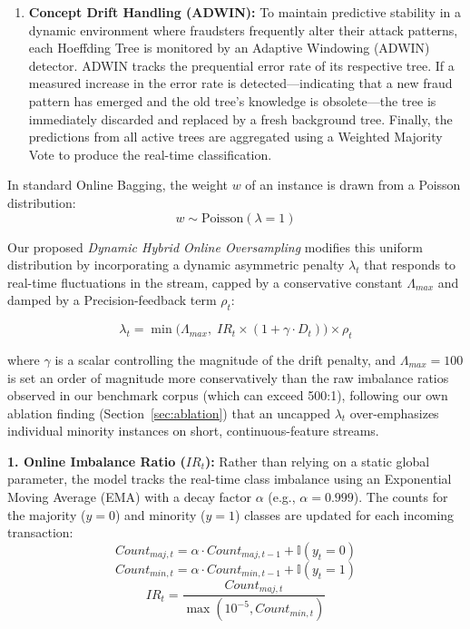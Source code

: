 \documentclass[review,12pt]{elsarticle}
\begin{document}
\begin{enumerate}
    \item \textbf{Concept Drift Handling (ADWIN):} To maintain predictive stability in a dynamic environment where fraudsters frequently alter their attack patterns, each Hoeffding Tree is monitored by an Adaptive Windowing (ADWIN) detector. ADWIN tracks the prequential error rate of its respective tree. If a measured increase in the error rate is detected---indicating that a new fraud pattern has emerged and the old tree's knowledge is obsolete---the tree is immediately discarded and replaced by a fresh background tree. Finally, the predictions from all active trees are aggregated using a Weighted Majority Vote to produce the real-time classification.
\end{enumerate}

In standard Online Bagging, the weight $w$ of an instance is drawn from a Poisson distribution:
\begin{equation}
    w \sim \text{Poisson}(\lambda=1)
\end{equation}

Our proposed \textit{Dynamic Hybrid Online Oversampling} modifies this uniform distribution by incorporating a dynamic asymmetric penalty $\lambda_t$ that responds to real-time fluctuations in the stream, capped by a conservative constant $\Lambda_{max}$ and damped by a Precision-feedback term $\rho_t$:

\begin{equation}
    \lambda_t = \min\big(\Lambda_{max},\; IR_t \times (1 + \gamma \cdot D_t)\big) \times \rho_t
\end{equation}

where $\gamma$ is a scalar controlling the magnitude of the drift penalty, and $\Lambda_{max}=100$ is set an order of magnitude more conservatively than the raw imbalance ratios observed in our benchmark corpus (which can exceed 500:1), following our own ablation finding (Section~\ref{sec:ablation}) that an uncapped $\lambda_t$ over-emphasizes individual minority instances on short, continuous-feature streams.

\textbf{1. Online Imbalance Ratio ($IR_t$):} Rather than relying on a static global parameter, the model tracks the real-time class imbalance using an Exponential Moving Average (EMA) with a decay factor $\alpha$ (e.g., $\alpha = 0.999$). The counts for the majority ($y=0$) and minority ($y=1$) classes are updated for each incoming transaction:
\begin{equation}
    Count_{maj, t} = \alpha \cdot Count_{maj, t-1} + \mathbb{I}(y_t = 0)
\end{equation}
\begin{equation}
    Count_{min, t} = \alpha \cdot Count_{min, t-1} + \mathbb{I}(y_t = 1)
\end{equation}
\begin{equation}
    IR_t = \frac{Count_{maj, t}}{\max(10^{-5}, Count_{min, t})}
\end{equation}
\end{document}
